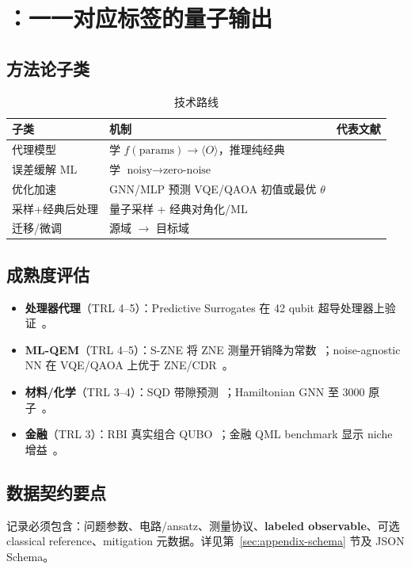 \section{\pathone{}：一一对应标签的量子输出}
\label{sec:path1}

\subsection{方法论子类}

\begin{table}[htbp]
  \centering
  \caption{\pathone{} 技术路线}
  \small
  \begin{tabular}{@{}p{2.2cm}p{3.5cm}p{6.5cm}@{}}
    \toprule
    子类 & 机制 & 代表文献 \\
    \midrule
    代理模型 & 学 $f(\text{params}) \rightarrow \langle O \rangle$，推理纯经典 & \cite{PredictiveSurrogates2026,ExplicitQuantumSurrogates2024} \\
    误差缓解 ML & 学 $\text{noisy} \rightarrow \text{zero-noise}$ & \cite{SZNE2025,NoiseAgnosticQEM2025,NNAS2025,CITLQMEM2025} \\
    优化加速 & GNN/MLP 预测 VQE/QAOA 初值或最优 $\theta$ & \cite{Qracle2025,MLVQEOptimiser2025} \\
    采样+经典后处理 & 量子采样 + 经典对角化/ML & \cite{SQDPeriodicMaterials2025} \\
    迁移/微调 & 源域 $\rightarrow$ 目标域 & \cite{TransferLearningNoisyQML2025,ResTdNN2025} \\
    \bottomrule
  \end{tabular}
\end{table}

\subsection{成熟度评估}

\begin{itemize}[leftmargin=*]
  \item \textbf{处理器代理}（TRL 4--5）：Predictive Surrogates 在 42 qubit 超导处理器上验证~\cite{PredictiveSurrogates2026}。
  \item \textbf{ML-QEM}（TRL 4--5）：S-ZNE 将 ZNE 测量开销降为常数~\cite{SZNE2025}；noise-agnostic NN 在 VQE/QAOA 上优于 ZNE/CDR~\cite{NoiseAgnosticQEM2025}。
  \item \textbf{材料/化学}（TRL 3--4）：SQD 带隙预测~\cite{SQDPeriodicMaterials2025}；Hamiltonian GNN 至 3000 原子~\cite{HamiltonianGNN2025}。
  \item \textbf{金融}（TRL 3）：RBI 真实组合 QUBO~\cite{PortfolioRBI2025}；金融 QML benchmark 显示 niche 增益~\cite{FinancialQMLBenchmark2026}。
\end{itemize}

\subsection{数据契约要点}

\pathone{} 记录必须包含：问题参数、电路/ansatz、测量协议、\textbf{labeled observable}、可选 classical reference、mitigation 元数据。详见第~\ref{sec:appendix-schema} 节及 JSON Schema。
